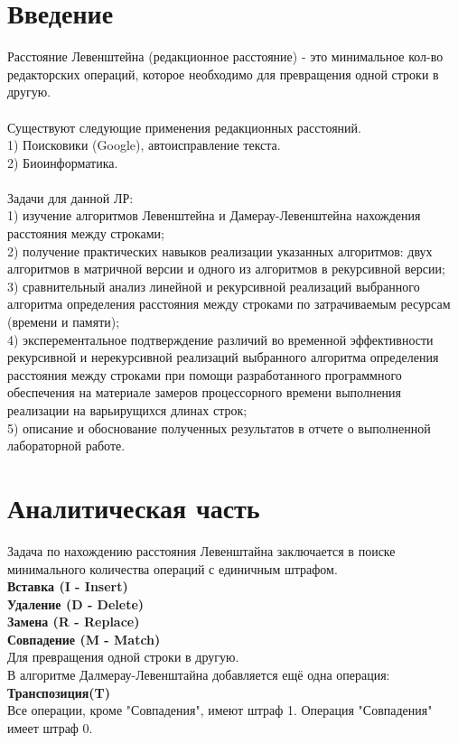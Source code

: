 \documentclass[12pt,a4paper]{article}
\begin{document}
\section*{\Huge Введение}
Расстояние Левенштейна (редакционное расстояние) - это минимальное кол-во редакторских операций, которое необходимо для превращения одной строки в другую.\\
\\
Существуют следующие применения редакционных расстояний.\\
1) Поисковики (Google), автоисправление текста.\\
2) Биоинформатика.\\
\\
Задачи для данной ЛР:\\
1) изучение алгоритмов Левенштейна и Дамерау-Левенштейна нахождения расстояния между строками;\\
2) получение практических навыков реализации указанных алгоритмов: двух алгоритмов в матричной версии и одного из алгоритмов в рекурсивной версии;\\
3) сравнительный анализ линейной и рекурсивной реализаций выбранного алгоритма определения расстояния между строками по затрачиваемым ресурсам (времени и памяти);\\
4) эксперементальное подтверждение различий во временной эффективности рекурсивной и нерекурсивной реализаций выбранного алгоритма определения расстояния между строками при помощи разработанного программного обеспечения на материале замеров процессорного времени выполнения реализации на варьирущихся длинах строк;\\
5) описание и обоснование полученных результатов в отчете о выполненной лабораторной работе.\\
\clearpage

\section{Аналитическая часть}
Задача по нахождению расстояния Левенштайна заключается в поиске минимального количества операций с единичным штрафом.\\
\textbf{Вставка (I - Insert)}\\
\textbf{Удаление (D - Delete)}\\
\textbf{Замена (R - Replace)}\\
\textbf{Совпадение (M - Match)}\\
Для превращения одной строки в другую.\\
В алгоритме Далмерау-Левенштайна добавляется ещё одна операция:\\
\textbf{Транспозиция(T)}\\
Все операции, кроме "Совпадения", имеют штраф 1. Операция "Совпадения" имеет штраф 0.
\newpage
\end{document}
